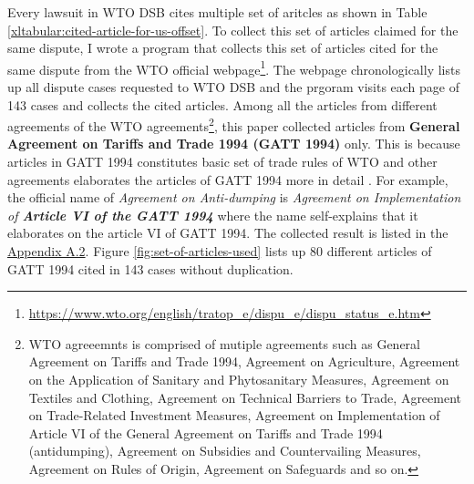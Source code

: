 Every lawsuit in WTO DSB 
cites multiple set of aritcles
as shown in Table 
\ref{xltabular:cited-article-for-us-offset}. 
To collect this set of articles claimed for the same dispute, I wrote a program that collects this set of articles cited for the same dispute from the WTO official webpage\footnote{\url{https://www.wto.org/english/tratop_e/dispu_e/dispu_status_e.htm}}. 
The webpage chronologically lists up all dispute cases
requested to WTO DSB and the prgoram visits each page of 143 cases
and collects the cited articles. Among all the articles from different agreements
of the WTO agreements\footnote{
    WTO agreeemnts is comprised of mutiple agreements such as
    General Agreement on Tariffs and Trade 1994,
    Agreement on Agriculture,
    Agreement on the Application of Sanitary and Phytosanitary Measures,
    Agreement on Textiles and Clothing,
    Agreement on Technical Barriers to Trade,
    Agreement on Trade-Related Investment Measures,
    Agreement on Implementation of Article VI of the General Agreement on Tariffs and Trade 1994 (antidumping),
    Agreement on Subsidies and Countervailing Measures,
    Agreement on Rules of Origin,
    Agreement on Safeguards and so on.
    },
this paper collected articles from \textbf{General Agreement on Tariffs and Trade 1994 (GATT 1994)} only. 
This is because articles in GATT 1994 constitutes basic set of trade rules of WTO and other agreements 
elaborates the articles of GATT 1994 more in detail \citep{world1999wto}. For example, the official name of \textit{Agreement on Anti-dumping}
is \textit{Agreement on Implementation of \textbf{Article VI of the GATT 1994}}
where the name self-explains that it elaborates on the article VI of GATT 1994.
The collected result is listed in the \hyperref[sub:cited-articles-table]{Appendix A.2}. Figure \ref{fig:set-of-articles-used} 
lists up 80 different articles of GATT 1994 cited in 143 cases without duplication.

